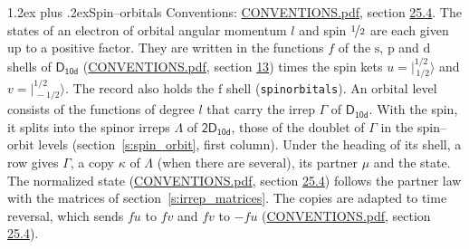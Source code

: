 \documentclass[10pt,a4paper]{article}
\makeatletter
\renewcommand\section{\@startsection{section}{1}{\z@}{-3ex plus -1ex minus -.2ex}%
  {1.2ex plus .2ex}{\normalfont\large\sffamily\bfseries\color{parttitle}}}
\numberwithin{equation}{section}
\newcommand{\grp}[1]{\mathsf{#1}}
\newcommand{\orbital}[1]{\mathrm{#1}}
\newcommand{\mult}{\kappa}
\newcommand{\intx}{\mu}
\newcommand{\jm}[2]{\bigl\lvert{}^{#1}_{\,#2}\bigr\rangle}
\makeatother
\begin{document}
\section{Spin--orbitals}\label{s:spin_orbitals}
Conventions: \href{../../CONVENTIONS.pdf}{CONVENTIONS.pdf}, section \href{../../CONVENTIONS.pdf\#conv.25.4}{25.4}.
\leavevmode\label{n:index.orbital.l}The states of an electron of orbital angular momentum $l$ and spin $\nicefrac{1}{2}$ are each given up to a positive factor. \label{n:local.spinor.uv}\label{n:local.function.f}They are written in the functions $f$ of the $\orbital{s}$, $\orbital{p}$ and $\orbital{d}$ shells of \href{../../../rotation/data/pdf/D10d.pdf}{$\grp{D_{10d}}$} (\href{../../CONVENTIONS.pdf}{CONVENTIONS.pdf}, section \href{../../../rotation/CONVENTIONS.pdf\#conv.13}{13}) times the spin kets $u = \jm{1/2}{1/2}$ and $v = \jm{1/2}{-1/2}$. The record also holds the $\orbital{f}$ shell (\texttt{spinorbitals}). An orbital level consists of the functions of degree $l$ that carry the irrep $\Gamma$ of \href{../../../rotation/data/pdf/D10d.pdf}{$\grp{D_{10d}}$}. With the spin, it splits into the spinor irreps $\Lambda$ of $\grp{2D_{10d}}$, those of the doublet of $\Gamma$ in the spin--orbit levels (section~\ref{s:spin_orbit}, first column). \label{n:head.state}Under the heading of its shell, a row gives $\Gamma$, a copy $\mult$ of $\Lambda$ (when there are several), its partner $\intx$ and the state. The normalized state (\href{../../CONVENTIONS.pdf}{CONVENTIONS.pdf}, section \href{../../CONVENTIONS.pdf\#conv.25.4}{25.4}) follows the partner law with the matrices of section~\ref{s:irrep_matrices}. The copies are adapted to time reversal, which sends $f u$ to $f v$ and $f v$ to $-f u$ (\href{../../CONVENTIONS.pdf}{CONVENTIONS.pdf}, section \href{../../CONVENTIONS.pdf\#conv.25.4}{25.4}).
\end{document}
